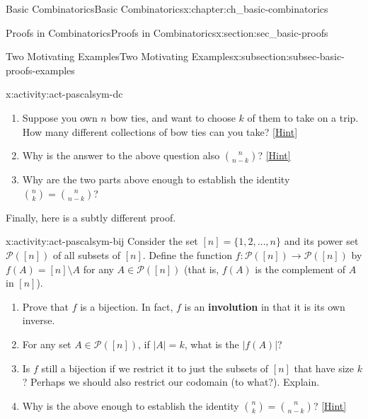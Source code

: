 \documentclass[oneside,10pt,]{book}
\newcommand{\terminology}[1]{\textbf{#1}}
\numberwithin{equation}{chapter}
\def\pow{\mathcal P}
\newcommand{\card}[1]{\left| #1 \right|}
\begin{document}
\begin{chapterptx}{Basic Combinatorics}{}{Basic Combinatorics}{}{}{x:chapter:ch_basic-combinatorics}
\begin{sectionptx}{Proofs in Combinatorics}{}{Proofs in Combinatorics}{}{}{x:section:sec_basic-proofs}
\begin{subsectionptx}{Two Motivating Examples}{}{Two Motivating Examples}{}{}{x:subsection:subsec-basic-proofs-examples}
\begin{activity}{}{x:activity:act-pascalsym-dc}
\begin{enumerate}[font=\bfseries,label=(\alph*),ref=\alph*]
\item{}Suppose you own \(n\) bow ties, and want to choose \(k\) of them to take on a trip.  How many different collections of bow ties can you take?%
\space\hspace*{0pt}\hfill{\tiny\hyperlink{g:hint:idm609-back}{[Hint]}}\item{}Why is the answer to the above question also \(\binom{n}{n-k}\)?%
\space\hspace*{0pt}\hfill{\tiny\hyperlink{g:hint:idm620-back}{[Hint]}}\item{}Why are the two parts above enough to establish the identity \(\binom{n}{k} = \binom{n}{n-k}\)?%
\end{enumerate}
\end{activity}
Finally, here is a subtly different proof.%
\begin{activity}{}{x:activity:act-pascalsym-bij}%
Consider the set \([n] = \{1,2,\ldots,n\}\) and its power set \(\pow([n])\) of all subsets of \([n]\).  Define the function \(f:\pow([n]) \to \pow([n])\) by \(f(A) = [n]\setminus A\) for any \(A \in \pow([n])\) (that is, \(f(A)\) is the complement of \(A\) in \([n]\)).%
\begin{enumerate}[font=\bfseries,label=(\alph*),ref=\alph*]
\item{}Prove that \(f\) is a bijection.  In fact, \(f\) is an \terminology{involution} in that it is its own inverse.%
\item{}For any set \(A \in \pow([n])\), if \(\card{A} = k\), what is the \(\card{f(A)}\)?%
\item{}Is \(f\) still a bijection if we restrict it to just the subsets of \([n]\) that have size \(k\)?  Perhaps we should also restrict our codomain (to what?).  Explain.%
\item{}Why is the above enough to establish the identity \(\binom{n}{k} = \binom{n}{n-k}\)?%
\space\hspace*{0pt}\hfill{\tiny\hyperlink{g:hint:idm671-back}{[Hint]}}\end{enumerate}
\end{activity}

\end{subsectionptx}
\end{sectionptx}
\end{chapterptx}
\end{document}
